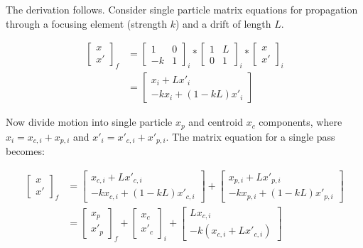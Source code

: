 The derivation follows. Consider single particle matrix equations for propagation through a focusing element (strength $k$) and a drift of length $L$. 

\begin{equation}
\begin{split}
\begin{bmatrix} x \\ x' \end{bmatrix}_f 
& = \begin{bmatrix} 1&0 \\ -k&1 \end{bmatrix}_i \ast \begin{bmatrix} 1&L \\ 0&1 \end{bmatrix}_i \ast \begin{bmatrix} x \\ x' \end{bmatrix}_i \\
& = \begin{bmatrix} x_i + Lx'_i \\ -kx_i + (1-kL)x'_i \end{bmatrix}
\end{split}
\end{equation}

Now divide motion into single particle $x_p$ and centroid $x_c$ components, where $x_i = x_{c,i} + x_{p,i}$ and $x'_i = x'_{c,i} + x'_{p,i}$. The matrix equation for a single pass becomes:

\begin{equation}
\begin{split}
\begin{bmatrix} x \\ x' \end{bmatrix}_f 
&= \begin{bmatrix} x_{c,i} + Lx'_{c,i} \\ -kx_{c,i} + (1-kL)x'_{c,i} \end{bmatrix} + \begin{bmatrix} x_{p,i} + Lx'_{p,i} \\ -kx_{p,i} + (1-kL)x'_{p,i} \end{bmatrix} \\
&=\begin{bmatrix} x_p \\ x'_p \end{bmatrix}_f + \begin{bmatrix} x_c \\ x'_c \end{bmatrix}_i + \begin{bmatrix} L x_{c,i} \\ -k(x_{c,i} + Lx'_{c,i}) \end{bmatrix}
\end{split}
\end{equation}

